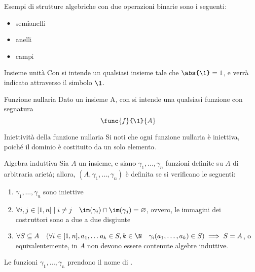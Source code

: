\documentclass[a4paper, 12pt]{report}
\begin{document}
    \begin{example}
        Esempi di strutture algebriche con due operazioni binarie sono i seguenti:

        \begin{itemize}
            \item semianelli
            \item anelli
            \item campi
        \end{itemize}
    \end{example}

    \begin{frameddefn}{Insieme unità}
        Con  si intende un qualsiasi insieme tale che $\abs{\1} = 1$, e verrà indicato attraverso il simbolo $\1$.
    \end{frameddefn}

    \begin{frameddefn}{Funzione nullaria}
        Dato un insieme A, con  si intende una qualsiasi funzione con segnatura $$\func{f}{\1}{A}$$
    \end{frameddefn}

    \begin{framedobs}[label={inj null}]{Iniettività della funzione nullaria}
        Si noti che ogni funzione nullaria è iniettiva, poiché il dominio è costituito da un solo elemento.
    \end{framedobs}

    \begin{frameddefn}[label={inductive algebra}]{Algebra induttiva}
        Sia $A$ un insieme, e siano $\gamma_1, \ldots, \gamma_n$ funzioni definite su $A$ di arbitraria arietà; allora, $(A, \gamma_1, \ldots, \gamma_n)$ è definita  se si verificano le seguenti:

        \begin{enumerate}[label=\roman*), font=\itshape]
            \item $\gamma_1, \ldots, \gamma_n$ sono iniettive
            \item $\forall i, j \in [1, n] \mid i \neq j \quad \im(\gamma_i) \cap \im(\gamma_j) = \varnothing$, ovvero, le immagini dei costruttori sono a due a due disgiunte
            \item $\forall S \subseteq A \quad (\forall i \in [1, n], a_1, \ldots a_k \in S, k \in \N  \quad \gamma_i(a_1, \ldots, a_k) \in S) \implies S = A$, o equivalentemente, in $A$ non devono essere contenute algebre induttive.
        \end{enumerate}

        Le funzioni $\gamma_1, \ldots, \gamma_n$ prendono il nome di .
    \end{frameddefn}
\end{document}
